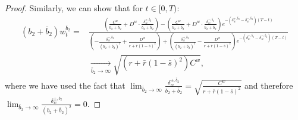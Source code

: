 \documentclass[11pt]{article}
\begin{document}
\begin{proof}
	Similarly, we can show that for $t \in [0,T)$:
	\begin{equation*}
	\begin{split}
	(b_2 + \bar{b}_2) w^{\bar{b}_2}_t =&\frac{ \left( \frac{C^{w}}{b_2 + \bar{b}_2} + D^{w}\cdot \frac{\delta^{+,\bar{b}_2}_w}{b_2 + \bar{b}_2}  \right) - \left( \frac{C^{w}}{b_2 + \bar{b}_2} + D^{w}\cdot \frac{\delta^{-,\bar{b}_2}_w}{b_2 + \bar{b}_2}  \right) e^{- (\delta^{+,\bar{b}_2}_w - \delta^{-,\bar{b}_2}_w)(T-t)}}{ \left(- \frac{\delta^{-,\bar{b}_2}_w}{(b_2 + \bar{b}_2)^2} + \frac{D^{w}}{r + \bar{r}(1-\bar{s})^2} \right) + \left( \frac{\delta^{+,\bar{b}_2}_w}{(b_2 + \bar{b}_2)^2} - \frac{D^{w}}{r + \bar{r}(1-\bar{s})^2} \right)e^{- (\delta^{+,\bar{b}_2}_w - \delta^{-,\bar{b}_2}_w)(T-t)} }\\
	&\xrightarrow[\bar{b}_2 \to \infty]{} \sqrt{(r + \bar{r}(1-\bar{s})^2) C^w},
	\end{split}
	\end{equation*}
	where we have used the fact that $\lim_{\bar{b}_2 \to \infty}\frac{\delta^{\pm,\bar{b}_2}_w}{b_2 + \bar{b}_2}=\sqrt{\frac{C^w}{r+\bar{r}(1-\bar{s})^2}}$ and therefore $\lim_{\bar{b}_2 \to \infty}\frac{\delta^{\pm,\bar{b}_2}_w}{(b_2 + \bar{b}_2)^2}=0$.
	

\end{proof}
\end{document}
